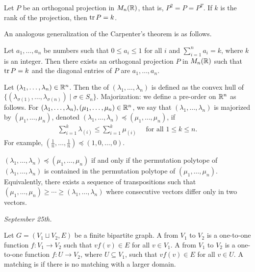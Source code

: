 \begin{theorem}
    Let $P$ be an orthogonal projection in $M_{n}(\mathbb{R})$, that is, $P^{2} = P = P^{T}$. If $k$ is the rank of the projection, then $\operatorname{tr} P = k$.
\end{theorem}

An analogous generalization of the Carpenter's theorem is as follows.

\begin{theorem}
    Let $a_{1},\ldots,a_{n}$ be numbers such that $0 \leq a_{i} \leq 1$ for all $i$ and $\sum_{i=1}^{n} a_{i} = k$, where $k$ is an integer. Then there exists an orthogonal projection $P$ in $M_{n}(\mathbb{R})$ such that $\operatorname{tr} P = k$ and the diagonal entries of $P$ are $a_{1},\ldots,a_{n}$.
\end{theorem}

Let $(\lambda_{1},\ldots,\lambda_{n}) \in \mathbb{R}^{n}$. Then the  of $(\lambda_{1},\ldots,\lambda_{n})$ is defined as the convex hull of $\{(\lambda_{\sigma(1)},\ldots,\lambda_{\sigma(n)}) \mid \sigma \in S_{n}\}$. Majorization: we define a pre-order on $\mathbb{R}^{n}$ as follows. For $(\lambda_{1},\ldots,\lambda_{n}), (\mu_{1},\ldots,\mu_{n}) \in \mathbb{R}^{n}$, we say that $(\lambda_{1},\ldots,\lambda_{n})$ is majorized by $(\mu_{1},\ldots,\mu_{n})$, denoted $(\lambda_{1},\ldots,\lambda_{n}) \preceq (\mu_{1},\ldots,\mu_{n})$, if
\begin{align}
    \sum_{i=1}^{k} \lambda_{(i)} \leq \sum_{i=1}^{k} \mu_{(i)} \quad \text{ for all } 1 \leq k \leq n.
\end{align}
For example, $(\frac{1}{n},\ldots,\frac{1}{n}) \preceq (1,0,\ldots,0)$.

\begin{theorem}
    $(\lambda_{1},\ldots,\lambda_{n}) \preceq (\mu_{1},\ldots,\mu_{n})$ if and only if the permutation polytope of $(\lambda_{1},\ldots,\lambda_{n})$ is contained in the permutation polytope of $(\mu_{1},\ldots,\mu_{n})$. Equivalently, there exists a sequence of transpositions such that $(\mu_{1},\ldots,\mu_{n}) \geq \cdots \geq (\lambda_{1},\ldots,\lambda_{n})$ where consecutive vectors differ only in two vectors.
\end{theorem}

\textit{September 25th.}

Let $G = (V_{1} \sqcup V_{2}, E)$ be a finite bipartite graph. A  from $V_{1}$ to $V_{2}$ is a one-to-one function $f:V_{1} \to V_{2}$ such that $vf(v) \in E$ for all $v \in V_{1}$. A  from $V_{1}$ to $V_{2}$ is a one-to-one function $f:U \to V_{2}$, where $U \subseteq V_{1}$, such that $vf(v) \in E$ for all $v \in U$. A matching is  if there is no matching with a larger domain.


